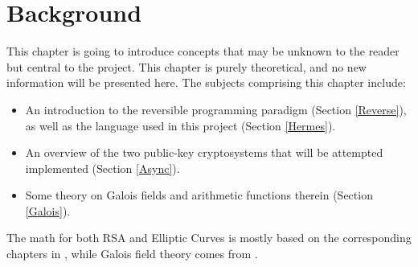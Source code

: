 


\chapter{Background}
This chapter is going to introduce concepts that may be unknown to the reader but central to the project. This chapter is purely theoretical, and no new information will be presented here. The subjects comprising this chapter include:
\begin{itemize}
\item An introduction to the reversible programming paradigm (Section \ref{Reverse}), as well as the language used in this project (Section \ref{Hermes}).
\item An overview of the two public-key cryptosystems that will be attempted implemented (Section \ref{Async}).
\item Some theory on Galois fields and arithmetic functions therein (Section \ref{Galois}).
\end{itemize}
The math for both RSA and Elliptic Curves is mostly based on the corresponding chapters in \cite{IntroToMath}, while Galois field theory comes from \cite{FiniteFieldArithmetic}.






